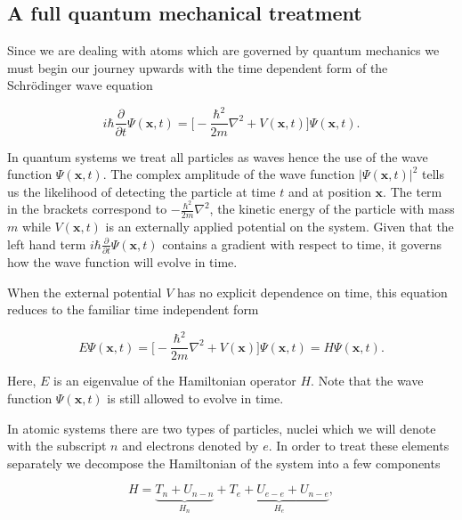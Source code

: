 \subsection{A full quantum mechanical treatment}
Since we are dealing with atoms which are governed by quantum mechanics we must begin our journey upwards with the time dependent form of the Schr\"{o}dinger wave equation

\begin{equation}
i\hbar \frac {\partial}{\partial t} \Psi (\textbf{x},t) = \big[ -\frac{\hbar ^2}{2m}\nabla^2 + V (\textbf{x}, t) \big] \Psi (\textbf{x},t).
\label {schordinger_time_dependent}
\end{equation}

In quantum systems we treat all particles as waves hence the use of the wave function $\Psi (\textbf{x},t)$. The complex amplitude of the wave function $|\Psi (\textbf {x}, t)|^2$ tells us the likelihood of detecting the particle at time $t$ and at position $\textbf{x}$. The term in the brackets correspond to $-\frac{\hbar ^2}{2m}\nabla^2 $, the kinetic energy of the particle with mass $m$ while $V (\textbf{x}, t)$ is an externally applied potential on the system. Given that the left hand term $i\hbar \frac {\partial}{\partial t} \Psi (\textbf{x},t)$ contains a gradient with respect to time, it governs how the wave function will evolve in time.

When the external potential $V$ has no explicit dependence on time, this equation reduces to the familiar time independent form

\begin{equation}
	E \Psi (\textbf{x}, t) = \big[ -\frac{\hbar ^2}{2m}\nabla^2 + V (\textbf{x}) \big] \Psi (\textbf{x}, t) = H \Psi(\textbf{x}, t).
 \end{equation}

Here, $E$ is an eigenvalue of the Hamiltonian operator $H$. Note that the wave function $\Psi (\textbf {x}, t)$ is still allowed to evolve in time. 

In atomic systems there are two types of particles, nuclei which we will denote with the subscript $n$ and electrons denoted by $e$. In order to treat these elements separately we decompose the Hamiltonian of the system into a few components 

\begin {equation}
H = \underbrace{T_n + U_{n-n}}_{H_n} + \underbrace{T_e +  U_{e-e} + U_{n-e}}_{H_e},
\end {equation}

